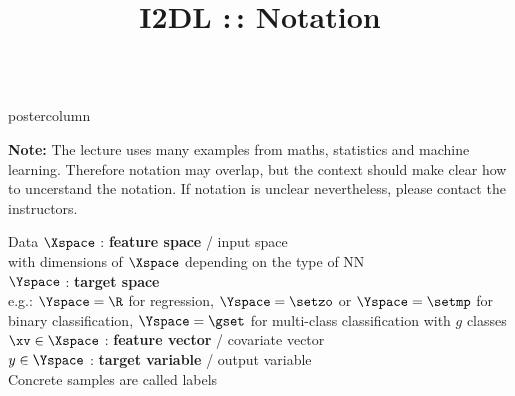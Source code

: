 \documentclass{beamer}
\title{I2DL :\,: Notation} %
\newlength{\columnheight} %
\begin{document}
\begin{frame}[fragile]{}
\vspace{-8ex}
\begin{columns}
	\begin{column}{.31\textwidth}
		\begin{beamercolorbox}[center]{postercolumn}
			\begin{minipage}{.98\textwidth}
				\parbox[t][\columnheight]{\textwidth}{
\begin{myblock}{}
\textbf{Note: } The lecture uses many examples from maths, statistics and machine learning. Therefore notation may overlap, but the context should make clear how to uncerstand the notation. If notation is unclear nevertheless, please contact the instructors.
\end{myblock}
\begin{myblock}{Data}
 $\Xspace$ : \textbf{feature space} / input space \\
 with dimensions of  $\Xspace$ depending on the type of NN \\

$\Yspace$ : \textbf{target space} \\ 
e.g.: $\Yspace = \R$ for regression, $\Yspace = \setzo$ or $\Yspace = \setmp$ for binary classification, $\Yspace = \gset$ for multi-class classification with $g$ classes\\

$\xv \in \Xspace$ : \textbf{feature vector} / covariate vector\\ 

 
$y \in \Yspace$ : \textbf{target variable} / output variable \\
Concrete samples are called labels \\


\end{myblock}}
\end{minipage}
\end{beamercolorbox}
\end{column}
\end{columns}
\end{frame}
\end{document}
